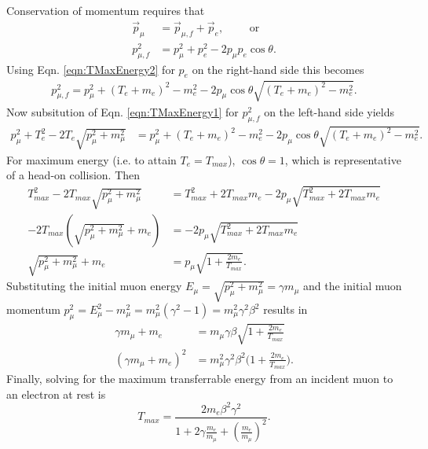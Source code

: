 Conservation of momentum requires that
\begin{align*}
\vec{p}_\mu&=\vec{p}_{\mu,f}+\vec{p}_e, \qquad\text{ or}\\
 p_{\mu,f}^2&=p_\mu ^2 + p_e^2-2p_\mu p_e \cos\theta.
\end{align*}
Using Eqn. \ref{eqn:TMaxEnergy2} for $p_e$ on the right-hand side this becomes
\begin{align*}
p_{\mu,f}^2=p_\mu ^2+(T_e+m_e)^2-m_e ^2-2p_\mu\cos\theta \sqrt{(T_e+m_e)^2-m_e^2}.
\end{align*}
Now subsitution of Eqn. \ref{eqn:TMaxEnergy1} for $p_{\mu,f} ^2$ on the left-hand side yields
\begin{align*}
p_\mu ^2+T_e ^2 - 2T_e \sqrt{p_\mu^2+m_\mu ^2}&=p_\mu ^2+(T_e+m_e)^2-m_e ^2 -2p_\mu\cos\theta\sqrt{(T_e+m_e)^2-m_e^2}.
\end{align*}
For maximum energy (i.e. to attain $T_e=T_{max}$), $\cos\theta=1$, which is representative of a head-on collision. Then
\begin{align*}
T_{max} ^2-2T_{max}\sqrt{p_\mu ^2+m_\mu ^2} &=T_{max}^2+2T_{max}m_e-2p_\mu\sqrt{T_{max}^2+2T_{max}m_e}\\
-2T_{max}(\sqrt{p_\mu ^2 + m_\mu ^2}+m_e)&=-2p_\mu\sqrt{T_{max}^2+2T_{max}m_e}\\
\sqrt{p_\mu ^2+m_\mu ^2}+m_e&=p_\mu\sqrt{1+\frac{2m_e}{T_{max}}}.
\end{align*}
Substituting the initial muon energy $E_\mu=\sqrt{p_\mu ^2+m_\mu ^2}=\gamma m_\mu$ and the initial muon momentum $p_\mu ^2=E_\mu ^2 - m_\mu ^2 = m_\mu ^2 (\gamma^2-1)=m_\mu ^2 \gamma^2 \beta^2$ results in
\begin{align*}
\gamma m_\mu + m_e &= m_\mu\gamma\beta\sqrt{1+\frac{2m_e}{T_{max}}}\\
(\gamma m_\mu +m_e)^2 &=m_\mu^2\gamma^2\beta^2 \Big(1+\frac{2m_e}{T_{max}}\Big).
\end{align*}
Finally, solving for the maximum transferrable energy from an incident muon to an electron at rest is
\begin{equation}\label{eqn:tmax}
T_{max}=\frac{2m_e \beta^2 \gamma^2}{1+2\gamma\frac{m_e}{m_\mu}+(\frac{m_e}{m_\mu})^2}.
\end{equation}

\label{ssc:ICOOLStragglingLandau}

